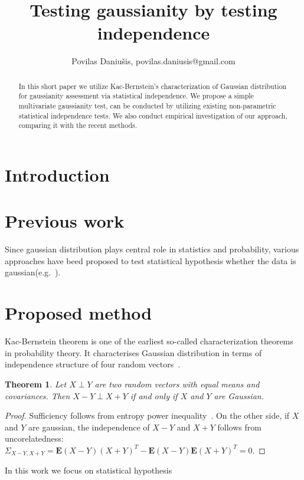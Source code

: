\documentclass{article}
\title{Testing gaussianity by testing independence}
\author{Povilas Daniušis, povilas.daniusis@gmail.com}
\newtheorem{theorem}{Theorem}
\begin{document}
\maketitle

\begin{abstract}
In this short paper we utilize Kac-Bernstein's characterization of Gaussian distribution for gaussianity assessment via statistical independence. We propose a simple multivariate gaussianity test, can be conducted by utilizing existing non-parametric statistical independence tests. We also conduct empirical investigation of our approach, comparing it with the recent methods.
\end{abstract}


\section{Introduction}


\section{Previous work}

Since gaussian distribution plays central role in statistics and probability, various approaches have beed proposed to test statistical hypothesis whether the data is gaussian(e.g.~\cite{ebner}).

\section{Proposed method}
Kac-Bernstein theorem is one of the earliest so-called characterization theorems in probability theory. It characterises Gaussian distribution in terms of independence structure of four random vectors~\cite{ref1}.

\begin{theorem}
\label{thm:KacBernstein}
Let $X \perp Y$ are two random vectors with equal means and covariances. Then $X-Y \perp X + Y$ if and only if $X$ and $Y$ are Gaussian.
\end{theorem}
\begin{proof}
Sufficiency follows from entropy power inequality~\cite{ref1}. On the other side, if $X$ and $Y$ are gaussian, the independence of $X-Y$ and $X + Y$ follows from uncorelatedness: $\Sigma_{X-Y,X+Y} = \mathbf{E} (X-Y)(X+Y)^{T} - \mathbf{E} (X-Y) \mathbf{E} (X+Y)^{T}= 0$.
\end{proof}

\noindent In this work we focus on statistical hypothesis 
\end{document}
